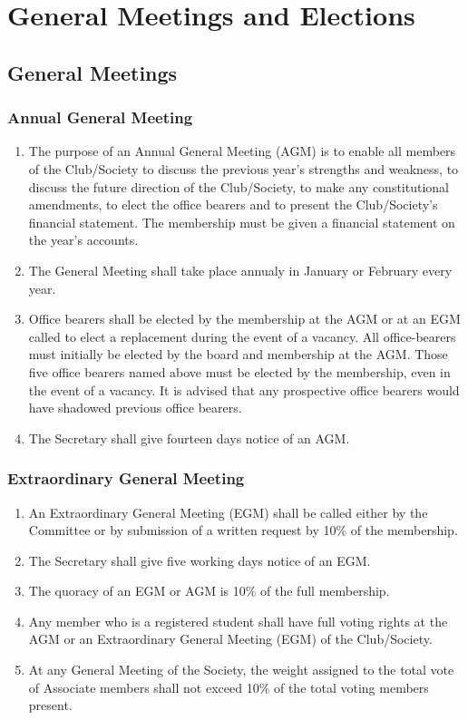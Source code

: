 \documentclass{report}
\newcommand{\bearersNo}{five}
\begin{document}
\chapter{General Meetings and Elections}


\section{General Meetings}
	\subsection{Annual General Meeting}
		\begin{enumerate}
			\item{The purpose of an Annual General Meeting (AGM) is to enable all members of the Club/Society to discuss the previous year’s strengths and weakness, to discuss the future direction of the Club/Society, to make any constitutional amendments, to elect the office bearers and to present the Club/Society’s financial statement. The membership must be given a financial statement on the year’s accounts. }
			\item{The General Meeting shall take place annualy in January or February every year.}
			\item{Office bearers shall be elected by the membership at the AGM or at an EGM called to elect a replacement during the event of a vacancy. All office-bearers must initially be elected by the board and membership at the AGM. Those \bearersNo{} office bearers named above must be elected by the membership, even in the event of a vacancy. It is advised that any prospective office bearers would have shadowed previous office bearers.}
			\item{The Secretary shall give fourteen days notice of an AGM.}
		\end{enumerate}
	\subsection{Extraordinary General Meeting}
		\begin{enumerate}
			\item{An Extraordinary General Meeting (EGM) shall be called either by the Committee or by submission of a written request by 10\% of the membership. }
			\item{The Secretary shall give five working days notice of an EGM.}
			\item{The quoracy of an EGM or AGM is 10\% of the full membership.}
			\item{Any member who is a registered student shall have full voting rights at the AGM or an Extraordinary General Meeting (EGM) of the Club/Society.}
			\item{At any General Meeting of the Society, the weight assigned to the total vote of Associate members shall not exceed 10\% of the total voting members present.}
		\end{enumerate}
\end{document}

